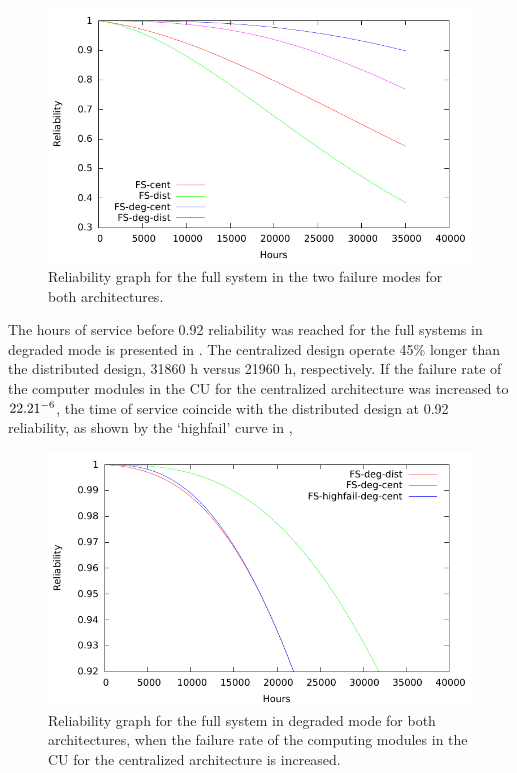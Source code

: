 \begin{figure}[H]
  \centering
  \includegraphics{plots/FS.pdf}
  \caption{Reliability graph for the full system in the two failure modes for both architectures.}
  \label{fig:fs}
\end{figure}

The hours of service before 0.92 reliability was reached for the full systems in degraded mode is presented in . The centralized design operate 45\% longer than the distributed design, 31860  h versus 21960 h, respectively. If the failure rate of the computer modules in the CU for the centralized architecture was increased to $22.21 \time 10^{-6}$, the time of service coincide with the distributed design at 0.92 reliability, as shown by the `highfail' curve in , 
\begin{figure}[H]
  \centering
  \includegraphics{plots/3b.pdf}
  \caption{Reliability graph for the full system in degraded mode for both architectures, when the failure rate of the computing modules in the CU for the centralized architecture is increased.}
  \label{fig:cfs_hf}
\end{figure}